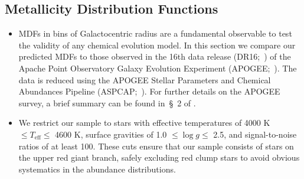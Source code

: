\documentclass[fleqn, usenatbib]{mnras}
\begin{document}
\subsection{Metallicity Distribution Functions} 
\label{sec:comp_obs:mdfs} 

\begin{itemize} 
	\item MDFs in bins of Galactocentric radius are a fundamental observable 
	to test the validity of any chemical evolution model. In this section we 
	compare our predicted MDFs to those observed in the 16th data release 
	(DR16;~\citealp{Ahumada2020}) of the Apache Point Observatory Galaxy 
	Evolution Experiment (APOGEE;~\citealp{Majewski2017}). The data is 
	reduced using the APOGEE Stellar Parameters and Chemical Abundances 
	Pipeline (ASPCAP;~\citealp{Holtzman2015, GarciaPerez2016}). For further 
	details on the APOGEE survey, a brief summary can be found in~\S~2 of 
	\citet{Weinberg2019}. 

	\item We restrict our sample to stars with effective temperatures of 4000 
	K $\leq T_\text{eff} \leq$ 4600 K, surface gravities of 1.0 
	$\leq \log g \leq$ 2.5, and signal-to-noise ratios of at least 100. These 
	cuts ensure that our sample consists of stars on the upper red giant 
	branch, safely excluding red clump stars to avoid obvious systematics in 
	the abundance distributions. 
\end{itemize}
\end{document}
